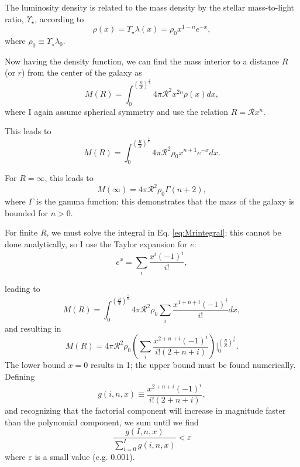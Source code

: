 \documentclass{article}
\begin{document}
The luminosity density is related to the mass density by the stellar mass-to-light ratio, $\Upsilon_{\star}$, according to 
\begin{equation} \rho(x) = \Upsilon_{\star} \lambda(x) = \rho_0 x^{1 - n} e^{-x}, \end{equation}
where $\rho_0 \equiv \Upsilon_{\star} \lambda_0$.

Now having the density function, we can find the mass interior to a distance $R$ (or $r$) from the center of the galaxy as
\begin{equation} M(R) = \int_0^{\left(\frac{R}{\mathcal{R}}\right)^{\frac{1}{n}}} 4\pi \mathcal{R}^2 x^{2n} \rho(x) dx, \end{equation}
where I again assume spherical symmetry and use the relation $R = \mathcal{R} x^n$.

This leads to 
\begin{equation}\label{eq:Mrintegral} M(R) = \int_0^{\left(\frac{R}{\mathcal{R}}\right)^{\frac{1}{n}}} 4\pi \mathcal{R}^2 \rho_0 x^{n + 1} e^{-x} dx. \end{equation}

For $R = \infty$, this leads to 
\begin{equation} M(\infty) = 4\pi \mathcal{R}^2 \rho_0 \Gamma(n + 2), \end{equation}
where $\Gamma$ is the gamma function; this demonstrates that the mass of the galaxy is bounded for $n > 0$.

For finite $R$, we must solve the integral in Eq. \ref{eq:Mrintegral}; this cannot be done analytically, so I use the Taylor expansion for $e$:
\begin{equation} e^x = \sum_{i} \dfrac{x^i (-1)^i}{i!}, \end{equation}

leading to 
\begin{equation} M(R) = \int_0^{\left(\frac{R}{\mathcal{R}}\right)^{\frac{1}{n}}} 4\pi \mathcal{R}^2 \rho_0 \sum_{i} \dfrac{x^{1 + n + i} (-1)^i}{i!} dx, \end{equation}
and resulting in
\begin{equation} M(R) = 4\pi \mathcal{R}^2 \rho_0 \left(\sum_{i} \dfrac{x^{2 + n + i} (-1)^i}{i!(2 + n + i)}\right)\Bigg|_0^{\left(\frac{R}{\mathcal{R}}\right)^{\frac{1}{n}}}. \end{equation}
The lower bound $x = 0$ results in 1; the upper bound must be found numerically. Defining 
\begin{equation}g(i,n,x) \equiv \dfrac{x^{2 + n + i} (-1)^i}{i!(2 + n + i)},\end{equation} 
and recognizing that the factorial component will increase in magnitude faster than the polynomial component, we sum until we find
\begin{equation} \dfrac{g(I,n,x)}{\sum_{i=0}^{I} g(i,n,x)} < \varepsilon \end{equation}
where $\varepsilon$ is a small value (e.g. 0.001).
\end{document}
